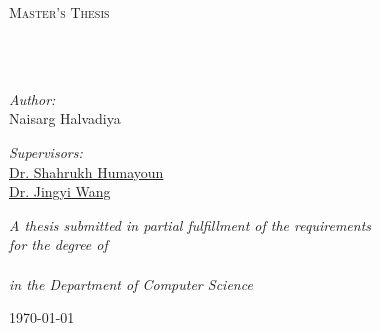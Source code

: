 \documentclass[
12pt, 
english,
onehalfspacing,
headsepline,
]{MastersDoctoralThesis}
\title{#2}  %
\author{Naisarg Halvadiya}
\begin{document}
\frontmatter

\let\cleardoublepage\clearpage

\pagestyle{plain}


\begin{singlespacing}


\begin{titlepage}
\begin{center}

\vspace*{.06\textheight}

{\scshape\LARGE \textcolor{SFSUPurple}{\univname}\par}\vspace{1.5cm}

\textsc{\Large Master's Thesis}\\[0.5cm]

\HRule \\[0.4cm]

{\huge\bfseries \ttitle\par}\vspace{0.4cm}

\HRule \\[1.5cm]

\begin{flushleft}
\emph{Author:}\\
Naisarg Halvadiya
\end{flushleft}

\begin{flushleft}
\emph{Supervisors:}\\
\href{https://faculty.sfsu.edu/~humayoun/}{\textcolor{SFSUPurple}{Dr. Shahrukh Humayoun}}\\
\href{https://cs.sfsu.edu/people/jingyi-wang}{\textcolor{SFSUPurple}{Dr. Jingyi Wang}}
\end{flushleft}
 
\vfill

\large \textit{A thesis submitted in partial fulfillment of the requirements\\
for the degree of \degreename\\~\\
in the Department of Computer Science}\\[0.3cm]
 
\vfill

{\large \today}\\[4cm]

\end{center}
\end{titlepage}

\restoregeometry

\end{singlespacing}
\end{document}
